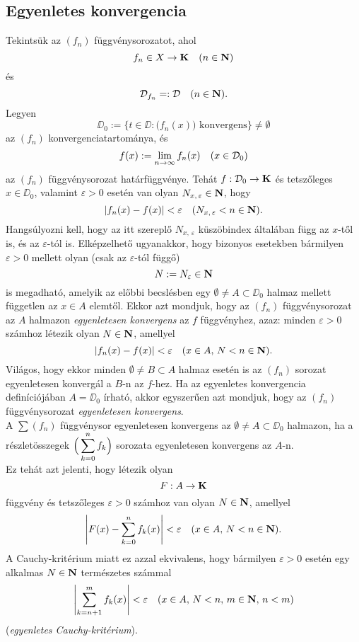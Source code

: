 \subsection{Egyenletes konvergencia}
Tekintsük az $(f_n)$ függvénysorozatot, ahol
\[
	f_n \in X \to \mathbf{K} \quad (n \in \mathbf{N})
\]
és
\[
	\mathcal{D}_{f_n} =: \mathcal{D} \quad (n \in \mathbf{N}).
\]
Legyen
\[
	\DD_0 := \Big\{ t \in \DD : \big( f_n(x)\big) \text { konvergens} \Big\} \neq \emptyset
\]
az $(f_n)$ konvergenciatartománya, és 
\[
	f(x) := \lim_{n \to \infty} f_n(x) \quad (x \in \mathcal{D}_0)
\]
az $(f_n)$ függvénysorozat határfüggvénye. Tehát $f : \mathcal{D}_0 \to \mathbf{K}$ és tetszőleges $x \in \DD_0$, valamint $\varepsilon > 0$ esetén van olyan $N_{x, \, \varepsilon} \in \mathbf{N}$, hogy
\[
	|f_n(x) - f(x)| < \varepsilon \quad (N_{x, \, \varepsilon} < n \in \mathbf{N}).
\]
Hangsúlyozni kell, hogy az itt szereplő $N_{x, \, \varepsilon}$ küszöbindex általában függ az $x$-től is, és az $\varepsilon$-tól is. Elképzelhető ugyanakkor, hogy bizonyos esetekben bármilyen $\varepsilon > 0$ mellett olyan (csak az $\varepsilon$-tól függő)
\[
	N := N_\varepsilon \in \mathbf{N}
\]
is megadható, amelyik az előbbi becslésben egy $\emptyset \neq A \subset \DD_0$ halmaz mellett független az $x \in A$ elemtől. Ekkor azt mondjuk, hogy az $(f_n)$ függvénysorozat az $A$ halmazon \textit{egyenletesen konvergens} az $f$ függvényhez, azaz: minden $\varepsilon > 0$ számhoz létezik olyan $N \in \mathbf{N}$, amellyel
\[
	|f_n(x) - f(x)| < \varepsilon \quad (x \in A, \, N < n \in \mathbf{N}).
\]
Világos, hogy ekkor minden $\emptyset \neq B \subset A$ halmaz esetén is az $(f_n)$ sorozat egyenletesen konvergál a $B$-n az $f$-hez. Ha az egyenletes konvergencia definíciójában $A = \DD_0$ írható, akkor egyszerűen azt mondjuk, hogy az $(f_n)$ függvénysorozat \textit{egyenletesen konvergens}.\\

A $\sum(f_n)$ függvénysor egyenletesen konvergens az $\emptyset \neq A \subset \DD_0$ halmazon, ha a részletösszegek $\displaystyle \Big( \sum_{k=0}^n f_k \Big)$ sorozata egyenletesen konvergens az $A$-n.\\

Ez tehát azt jelenti, hogy létezik olyan
\[
	F : A \to \mathbf{K}
\]
függvény és tetszőleges $\varepsilon > 0$ számhoz van olyan $N \in \mathbf{N}$, amellyel
\[
	\left| F(x) - \sum_{k=0}^n f_k(x) \right| < \varepsilon \quad (x \in A, \, N < n \in \mathbf{N}).
\]
A Cauchy-kritérium miatt ez azzal ekvivalens, hogy bármilyen $\varepsilon > 0$ esetén egy alkalmas $N \in \mathbf{N}$ természetes számmal
\[
	\left|  \sum_{k=n+1}^m f_k(x) \right| < \varepsilon \quad (x \in A, \, N < n, \, m \in \mathbf{N}, \, n < m)
\]
(\textit{egyenletes Cauchy-kritérium}).\\

